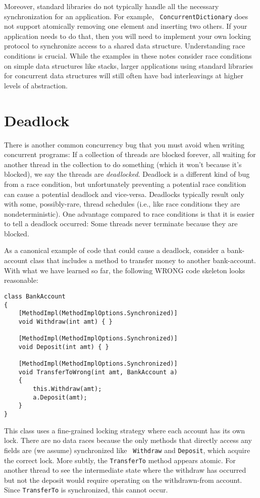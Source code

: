 \documentclass[10pt]{article}
\begin{document}
Moreover, standard libraries do not typically handle all the necessary
synchronization for an application.  For example, {\tt
  ConcurrentDictionary} does not support atomically removing one element
and inserting two others.  If your application needs to do that, then
you will need to implement your own locking protocol to synchronize
access to a shared data structure.  Understanding race conditions is
crucial.  While the examples in these notes consider race conditions
on simple data structures like stacks, larger applications using
standard libraries for concurrent data structures will still often
have bad interleavings at higher levels of abstraction.

\section{Deadlock}
\label{sec:deadlock}

There is another common concurrency bug that you must avoid when
writing concurrent programs: If a collection of threads are blocked
forever, all waiting for another thread in the collection to do
something (which it won't because it's blocked), we say the threads
are \emph{deadlocked}.  Deadlock is a different kind of bug from a
race condition, but unfortunately preventing a potential race
condition can cause a potential deadlock and vice-versa.  Deadlocks
typically result only with some, possibly-rare, thread schedules
(i.e., like race conditions they are nondeterministic).  One
advantage compared to race conditions is that it is easier to tell a
deadlock occurred: Some threads never terminate because they are
blocked.

As a canonical example of code that could cause a deadlock, consider a
bank-account class that includes a method to transfer money to another
bank-account.  With what we have learned so far, the following WRONG
code skeleton looks reasonable:
\begin{verbatim}
class BankAccount
{
    [MethodImpl(MethodImplOptions.Synchronized)]
    void Withdraw(int amt) { }

    [MethodImpl(MethodImplOptions.Synchronized)]
    void Deposit(int amt) { }

    [MethodImpl(MethodImplOptions.Synchronized)]
    void TransferToWrong(int amt, BankAccount a)
    {
        this.Withdraw(amt);
        a.Deposit(amt);
    }
}
\end{verbatim}
This class uses a fine-grained locking strategy where each account has
its own lock.  There are no data races because the only methods that
directly access any fields are (we assume) synchronized like {\tt
  Withdraw} and {\tt Deposit}, which acquire the correct lock.  More
subtly, the {\tt TransferTo} method appears atomic.  For another
thread to see the intermediate state where the withdraw has occurred
but not the deposit would require operating on the withdrawn-from
account.  Since {\tt TransferTo} is synchronized, this cannot occur.
\end{document}
